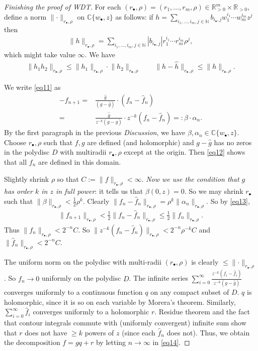 \documentclass[12pt,b5paper,notitlepage]{report}
\theoremstyle{definition}
\theoremstyle{plain}
\newcommand{\wht}{\widehat}
\newcommand{\blt}{\bullet}
\newcommand{\Cbb}{\mathbb C}
\newcommand{\Nbb}{\mathbb N}
\newcommand{\Rbb}{\mathbb R}
\numberwithin{equation}{section}
\begin{document}
\begin{proof}[Finishing the proof of WDT]
For each $(r_\blt,\rho)=(r_1,\dots,r_m,\rho)\in\Rbb_{>0}^m\times\Rbb_{>0}$, define a norm $\lVert\cdot \lVert_{r_\blt,\rho}$ on $\Cbb\{w_\blt,z\}$ as follows: if $h=\sum_{i_1,\dots,i_m,j\in\Nbb}b_{i_\blt,j}w_1^{i_1}\cdots w_m^{i_m}z^j$ then
\begin{align*}
\lVert h\lVert_{r_\blt,\rho}=\sum_{i_1,\dots,i_m,j\in\Nbb}|b_{i_\blt,j}|r_1^{i_1}\cdots r_m^{i_m}\rho^j,
\end{align*}
which might take value $\infty$. We have
\begin{align}
\lVert h_1h_2\lVert_{r_\blt,\rho}\leq \lVert h_1\lVert_{r_\blt,\rho}\cdot\lVert h_2\lVert_{r_\blt,\rho}\qquad \lVert h-\wht h\lVert_{r_\blt,\rho}\leq \lVert h\lVert_{r_\blt,\rho}.\label{eq13}
\end{align}


We write \eqref{eq11} as
\begin{align}
-f_{n+1}=&\frac{\wht g}{(g-\wht g)}\cdot (f_n-\wht f_n)\nonumber\\
=&\frac{\wht g}{z^{-k}(g-\wht g)}\cdot z^{-k}(f_n-\wht f_n)=:\beta\cdot \alpha_n.\label{eq12}
\end{align}
By the first paragraph in the previous \emph{Discussion}, we have $\beta,\alpha_n\in\Cbb\{w_\blt,z\}$. Choose $r_\blt,\rho$ such that $f,g$ are defined (and holomorphic) and $g-\wht g$ has no zeros in the polydisc $D$ with multiradii $r_\blt,\rho$ except at the origin. Then \eqref{eq12} shows that all $f_n$ are defined in this domain.

Slightly shrink $\rho$ so that $C:=\lVert f\lVert_{r_\blt,\rho}<\infty$. \emph{Now we use the condition that $g$ has order $k$ in $z$ in full power}: it tells us that $\beta(0,z)=0$. So we may shrink $r_\blt$ such that $\lVert\beta\lVert_{r_\blt,\rho}<\frac 12\rho^k$. Clearly $\lVert f_n-\wht f_n\lVert_{r_\blt,\rho}=\rho^k\lVert\alpha_n\lVert_{r_\blt,\rho}$. So by \eqref{eq13}, 
\begin{align*}
\lVert f_{n+1}\lVert_{r_\blt,\rho}<\frac 12\lVert f_n-\wht f_n\lVert_{r_\blt,\rho}\leq \frac 12\lVert f_n\lVert_{r_\blt,\rho}.
\end{align*}
Thus $\lVert f_n\lVert_{r_\blt,\rho}< 2^{-n}C$. So $\lVert z^{-k}(f_n-\wht f_n)\lVert_{r_\blt,\rho}<2^{-n}\rho^{-k}C$ and $\lVert\wht f_n\lVert_{r_\blt,\rho}<2^{-n}C$.

The uniform norm on the polydisc with multi-radii $(r_\blt,\rho)$ is clearly $\leq \lVert\cdot\lVert_{r_\blt,\rho}$. So $f_n\rightarrow 0$ uniformly on the polydisc $D$. 
The infinite series $\sum_{i=0}^\infty\frac{z^{-k}(f_i-\wht f_i)}{z^{-k}(g-\wht g)}$ converges uniformly to a continuous function $q$ on any compact subset of $D$. $q$ is holomorphic, since it is so on each variable by Morera's theorem. Similarly, $\sum_{i=0}^\infty\wht f_i$ converges uniformly to a holomorphic $r$. Residue theorem and the fact that contour integrals commute with (uniformly convergent) infinite sum show that $r$ does not have $\geq k$ powers of $z$ (since each $\wht f_n$ does not). Thus, we obtain the decomposition $f=gq+r$ by letting $n\rightarrow\infty$ in \eqref{eq14}.
\end{proof}
\end{document}
